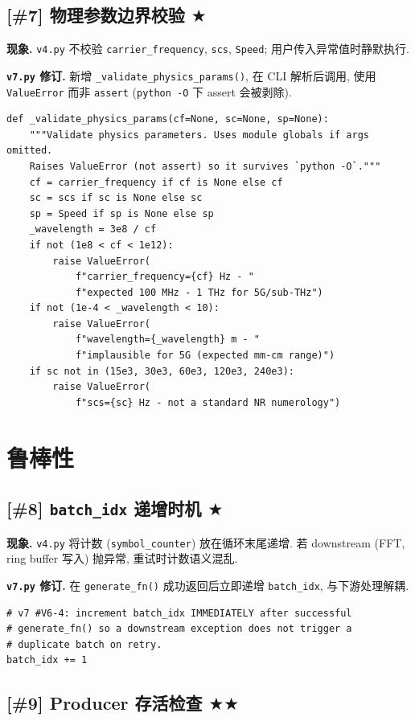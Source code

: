 \documentclass[11pt,a4paper,UTF8,fontset=fandol]{ctexart}
\newcommand{\sone}{\textcolor{starcolor}{$\bigstar$}}
\newcommand{\stwo}{\textcolor{starcolor}{$\bigstar\bigstar$}}
\newcommand{\vfour}{\texttt{v4.py}}
\newcommand{\vseven}{\texttt{v7.py}}
\newcommand{\bugitem}[3]{%
  \subsection{[\##1] #2 \hfill #3}%
  \vspace{-0.5em}%
}
\begin{document}
\bugitem{7}{物理参数边界校验}{\sone}

\textbf{现象.} \vfour{} 不校验 \texttt{carrier\_frequency}, \texttt{scs},
\texttt{Speed}; 用户传入异常值时静默执行.

\textbf{\vseven{} 修订.} 新增 \texttt{\_validate\_physics\_params()},
在 CLI 解析后调用, 使用 \texttt{ValueError} 而非 \texttt{assert}
(\texttt{python -O} 下 assert 会被剥除).
\begin{lstlisting}[caption={v7.py: lines 256--274}]
def _validate_physics_params(cf=None, sc=None, sp=None):
    """Validate physics parameters. Uses module globals if args omitted.
    Raises ValueError (not assert) so it survives `python -O`."""
    cf = carrier_frequency if cf is None else cf
    sc = scs if sc is None else sc
    sp = Speed if sp is None else sp
    _wavelength = 3e8 / cf
    if not (1e8 < cf < 1e12):
        raise ValueError(
            f"carrier_frequency={cf} Hz - "
            f"expected 100 MHz - 1 THz for 5G/sub-THz")
    if not (1e-4 < _wavelength < 10):
        raise ValueError(
            f"wavelength={_wavelength} m - "
            f"implausible for 5G (expected mm-cm range)")
    if sc not in (15e3, 30e3, 60e3, 120e3, 240e3):
        raise ValueError(
            f"scs={sc} Hz - not a standard NR numerology")
\end{lstlisting}

\section{鲁棒性}
\label{sec:robustness}

\bugitem{8}{\texttt{batch\_idx} 递增时机}{\sone}

\textbf{现象.} \vfour{} 将计数 (\texttt{symbol\_counter}) 放在循环末尾递增.
若 downstream (FFT, ring buffer 写入) 抛异常, 重试时计数语义混乱.

\textbf{\vseven{} 修订.} 在 \texttt{generate\_fn()} 成功返回后立即递增
\texttt{batch\_idx}, 与下游处理解耦.
\begin{lstlisting}[caption={v7.py: lines 2199--2202}]
# v7 #V6-4: increment batch_idx IMMEDIATELY after successful
# generate_fn() so a downstream exception does not trigger a
# duplicate batch on retry.
batch_idx += 1
\end{lstlisting}

\bugitem{9}{Producer 存活检查}{\stwo}
\end{document}
